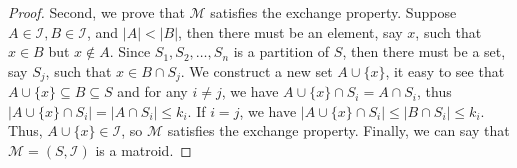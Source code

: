 \documentclass[12pt,a4paper]{article}
\theoremstyle{definition}
\begin{document}
\begin{enumerate}
\begin{proof}
        Second, we prove that $\mathcal{M}$ satisfies the exchange property. Suppose $A \in \mathcal{I}, B \in \mathcal{I}$, and $|A| < |B|$, then there must be an element, say $x$, such that $x \in B$ but $x \notin A$. Since $S_1,S_2,\dots,S_n$ is a partition of $S$, then there must be a set, say $S_j$, such that $x \in B \cap S_j$. We construct a new set $A \cup \{x\}$, it easy to see that $A \cup \{x\} \subseteq B \subseteq S$ and for any $i \neq j$, we have $A \cup \{x\} \cap S_i = A \cap S_i$, thus $|A \cup \{x\} \cap S_i| = |A \cap S_i| \leq k_i$. If $i = j$, we have $|A \cup \{x\} \cap S_i| \leq |B \cap S_i| \leq k_i$. Thus, $A \cup \{x\} \in \mathcal{I}$, so $\mathcal{M}$ satisfies the exchange property. Finally, we can say that $\mathcal{M}=(S,\mathcal{I})$ is a matroid.
    \end{proof}

\end{enumerate}

\end{document}
